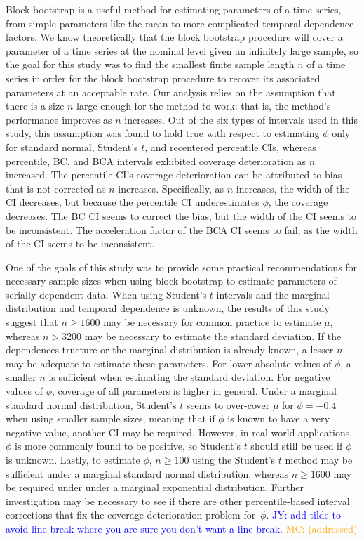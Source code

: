 \documentclass[10pt]{article}
\newcommand{\jy}[1]{\textcolor{blue}{JY: #1}}
\newcommand{\mc}[1]{\textcolor{orange}{MC: (#1)}}
\begin{document}
Block bootstrap is a useful method for estimating parameters of a time series,
from simple parameters like the mean to more complicated temporal dependence
factors. We know theoretically that the block bootstrap procedure will cover a 
parameter of a time series at the nominal level given an infinitely large 
sample, \citep{calhoun2018} so the goal for this study was to find the smallest 
finite sample length 
$n$ of a time series in order for the block bootstrap procedure to recover its 
associated parameters at an acceptable rate. Our analysis relies on the 
assumption that there is a size $n$ large enough for the method to work: that 
is, the method's performance improves as $n$ increases. Out of the six types of 
intervals used in this study, this assumption was found to hold true with 
respect to estimating $\phi$ only for standard normal, Student's $t$, and recentered 
percentile CIs, whereas percentile, BC, and BCA intervals exhibited coverage 
deterioration as $n$ increased. The percentile CI's coverage deterioration can 
be attributed to bias that is not corrected as $n$ increases. Specifically, as 
$n$ increases, the width of the CI decreases, but because the percentile CI 
underestimates $\phi$, the coverage decreases. The BC CI seems to correct the 
bias, but the width of the CI seems to be inconsistent. The acceleration factor 
of the BCA CI seems to fail, as the width of the CI seems to be inconsistent. 


One of the goals of this study was to provide some practical recommendations for 
necessary sample sizes when using block bootstrap to estimate parameters of 
serially dependent data. When using Student's $t$ intervals and the marginal
distribution and temporal dependence is 
unknown, the results of this study suggest that $n \geq 1600$ may be necessary 
for common practice to estimate $\mu$, whereas $n > 3200$ may be necessary
to estimate the standard deviation. If 
the dependences tructure or the marginal distribution is already known, a 
lesser $n$ may be 
adequate to estimate these 
parameters. For lower absolute values of $\phi$, a smaller $n$ is sufficient 
when estimating the standard deviation. For negative values of $\phi$, coverage of all 
parameters is higher in general. Under a marginal standard normal distribution, 
Student's $t$ seems to over-cover 
$\mu$ for $\phi = - 0.4$  when 
using smaller sample sizes, meaning that if $\phi$ 
is known to have a very negative value, another CI may be required. However, in 
real world applications, $\phi$ is more commonly found to be positive, so 
Student's $t$ should still be used if $\phi$ is unknown. 
Lastly, to estimate 
$\phi$, $n \geq 100$ using the Student's $t$ method may be sufficient under
a marginal standard normal distribution, whereas $n \geq 1600$ may be required
under under a marginal exponential distribution. Further
investigation may be necessary to see if there are other percentile-based 
interval corrections
that fix the coverage deterioration problem for~$\phi$.
\jy{add tilde to avoid line break where you are sure you don't want a
  line break.}
\mc{addressed}
\end{document}
